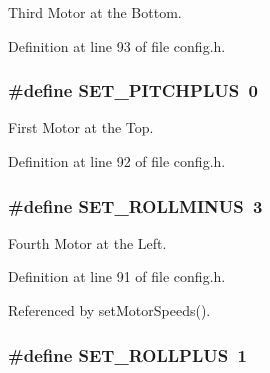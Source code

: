 Third Motor at the Bottom. 



Definition at line 93 of file config.\-h.

\hypertarget{group__config_gaf0a00d922db66d875ca53f6db34e7307}{
\subsubsection[{S\-E\-T\-\_\-\-P\-I\-T\-C\-H\-P\-L\-U\-S}]{\setlength{\rightskip}{0pt plus 5cm}\#define S\-E\-T\-\_\-\-P\-I\-T\-C\-H\-P\-L\-U\-S~0}}\label{group__config_gaf0a00d922db66d875ca53f6db34e7307}


First Motor at the Top. 



Definition at line 92 of file config.\-h.

\hypertarget{group__config_ga9921670161925a1d7b946aeb65d5767a}{
\subsubsection[{S\-E\-T\-\_\-\-R\-O\-L\-L\-M\-I\-N\-U\-S}]{\setlength{\rightskip}{0pt plus 5cm}\#define S\-E\-T\-\_\-\-R\-O\-L\-L\-M\-I\-N\-U\-S~3}}\label{group__config_ga9921670161925a1d7b946aeb65d5767a}


Fourth Motor at the Left. 



Definition at line 91 of file config.\-h.



Referenced by set\-Motor\-Speeds().

\hypertarget{group__config_ga460dbe0039d252579c5ce8beef7cc709}{
\subsubsection[{S\-E\-T\-\_\-\-R\-O\-L\-L\-P\-L\-U\-S}]{\setlength{\rightskip}{0pt plus 5cm}\#define S\-E\-T\-\_\-\-R\-O\-L\-L\-P\-L\-U\-S~1}}\label{group__config_ga460dbe0039d252579c5ce8beef7cc709}


